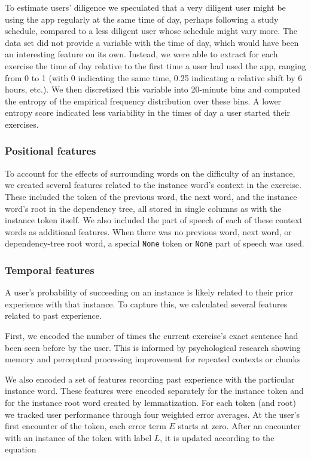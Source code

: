 \documentclass[11pt,a4paper]{article}
\begin{document}

To estimate users' diligence we speculated that a very diligent user might be using the app regularly at the same time of day, perhaps following a study schedule, compared to a less diligent user whose schedule might vary more. The data set did not provide a variable with the time of day, which would have been an interesting feature on its own. Instead, we were able to extract for each exercise the time of day relative to the first time a user had used the app, ranging from 0 to 1 (with 0 indicating the same time, 0.25 indicating a relative shift by 6 hours, etc.).  We then discretized this variable into 20-minute bins and computed the entropy of the empirical frequency distribution over these bins. A lower entropy score indicated less variability in the times of day a user started their exercises.

\subsubsection{Positional features}

To account for the effects of surrounding words on the difficulty of an
instance, we created several features related to the instance word's context in
the exercise. These included the token of the previous word, the next word, and
the instance word's root in the dependency tree, all stored in single columns as with
the instance token itself. We also included the part of speech of each of these
context words as additional features. When there was no previous word, next word, or dependency-tree
root word, a special {\tt None} token or {\tt None} part of speech was used.

\subsubsection{Temporal features}

A user's probability of succeeding on an instance is likely related to their
prior experience with that instance. To capture this, we calculated several
features related to past experience. 

First, we encoded the number of times the
current exercise's exact sentence had been seen before by the user. This is
informed by psychological research showing memory and perceptual processing
improvement for repeated contexts or chunks~\cite[e.g.,][]{Chun:1999gt} 

We also encoded a set of features recording past experience with
the particular instance word. These features were encoded separately for the
instance token and for the instance root word created by lemmatization.
For each token (and root) we tracked user performance through four weighted
error averages. At the user's first encounter of the token, each error term $E$ starts at
zero. After an encounter with an instance of the token with label $L$, it is
updated according to the equation
\end{document}
